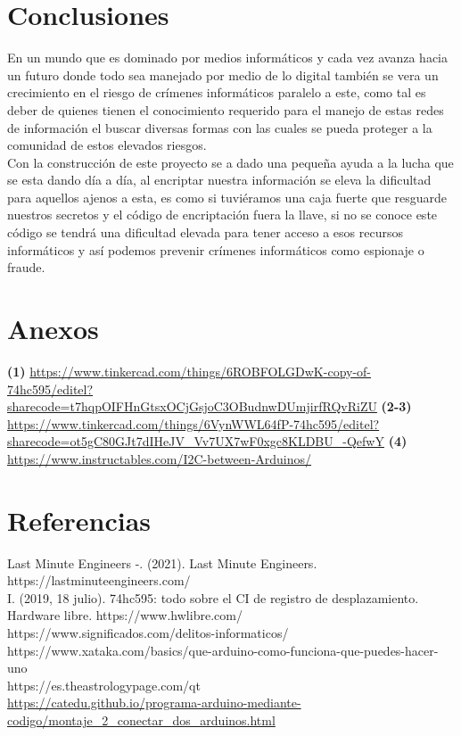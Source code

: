 \documentclass{article}
\begin{document}
\section{Conclusiones}
\label{Conclusiones}
\begin{justify}
En un mundo que es dominado por medios informáticos y cada vez avanza hacia un futuro donde todo sea manejado por medio de lo digital también se vera un crecimiento en el riesgo de crímenes informáticos paralelo a este, como tal es deber de quienes tienen el conocimiento requerido para el manejo de estas redes de información el buscar diversas formas con las cuales se pueda proteger a la comunidad de estos elevados riesgos.\\

Con la construcción de este proyecto se a dado una pequeña ayuda a la lucha que se esta dando día a día, al encriptar nuestra información se eleva la dificultad para aquellos ajenos a esta, es como si tuviéramos una caja fuerte que resguarde nuestros secretos y el código de encriptación fuera la llave, si no se conoce este código se tendrá una dificultad elevada para tener acceso a esos recursos informáticos y así podemos prevenir crímenes informáticos como espionaje o fraude.
\end{justify}


\newpage
\section{Anexos}
\label{Anexos}
\textbf{(1)}
\url{https://www.tinkercad.com/things/6ROBFOLGDwK-copy-of-74hc595/editel?sharecode=t7hqpOIFHnGtsxOCjGsjoC3OBudnwDUmjirfRQvRiZU}
\newline
\newline
\textbf{(2-3)}
\url{https://www.tinkercad.com/things/6VynWWL64fP-74hc595/editel?sharecode=ot5gC80GJt7dIHeJV_Vv7UX7wF0xgc8KLDBU_-QefwY}
\newline
\newline
\textbf{(4)}
\url{https://www.instructables.com/I2C-between-Arduinos/}
\newpage
\section{Referencias}
\label{Referencias}

\justify
Last Minute Engineers -. (2021). Last Minute Engineers. https://lastminuteengineers.com/\\
\newline
I. (2019, 18 julio). 74hc595: todo sobre el CI de registro de desplazamiento. Hardware libre. https://www.hwlibre.com/\\
\newline
https://www.significados.com/delitos-informaticos/\\
\newline
https://www.xataka.com/basics/que-arduino-como-funciona-que-puedes-hacer-uno\\
\newline
https://es.theastrologypage.com/qt\\

\url{https://catedu.github.io/programa-arduino-mediante-codigo/montaje_2_conectar_dos_arduinos.html}
\end{document}
